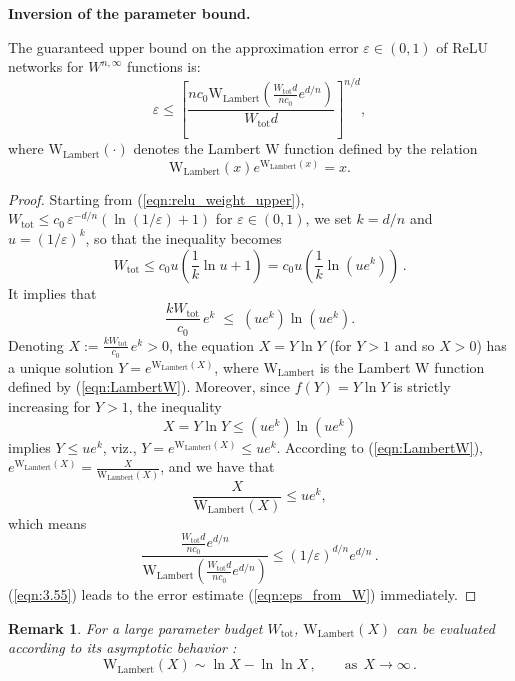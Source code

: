 \documentclass[final,hidelinks,onefignum,onetabnum]{siamart251216}
\newtheorem{remark}{Remark}
\begin{document}
\noindent\textbf{Inversion of the parameter bound.}
\begin{corollary}\label{cor:ReLu_approx}
The guaranteed upper bound on the approximation error $\varepsilon \in (0,1)$ of ReLU networks for $W^{n,\infty}$ functions is:
\begin{equation}\label{eqn:eps_from_W}
    \varepsilon \le \left[ \frac{n c_{0} \mathrm{W_{Lambert}}\left( \frac{W_{\mathrm{tot}} d}{n c_{0}} e^{d/n} \right)}{W_{\mathrm{tot}} d} \right]^{n/d},
\end{equation}
where $\mathrm{W_{Lambert}}(\cdot)$ denotes the Lambert $\mathrm{W}$ function \cite{corless1996lambert} defined by the relation
\begin{equation}\label{eqn:LambertW}
\mathrm{W_{Lambert}}(x)e^{\mathrm{W_{Lambert}}(x)}= x. 
\end{equation}
\end{corollary}
\begin{proof}
Starting from (\ref{eqn:relu_weight_upper}), $W_{\mathrm{tot}} \le c_{0}\,\varepsilon^{-d/n}(\ln(1/\varepsilon)+1)$ for $\varepsilon \in (0,1)$, we set $k = d/n$ and $u =(1/\varepsilon)^k$, so that the inequality becomes 
\[
W_{\mathrm{tot}} \le c_{0}u\left(\frac{1}{k}\ln u + 1\right)=c_{0}u \left(\frac{1}{k}\ln(ue^k)\right)\,.
\] 
It implies that
\[
\frac{kW_{\mathrm{tot}}}{c_{0}}\,e^k \;\le\; (ue^k)\ln(ue^k).
\]
Denoting $X:=\frac{kW_{\mathrm{tot}}}{c_{0}}\,e^k>0$, the equation $X=Y\ln Y$ (for $Y>1$ and so $X>0$) has a unique solution $Y = e^{\mathrm{W_{Lambert}}(X)}$, where $\mathrm{W_{Lambert}}$ is the Lambert $\mathrm{W}$ function \cite{corless1996lambert} defined by (\ref{eqn:LambertW}). Moreover, since $f(Y) = Y\ln Y$ is strictly increasing for $Y>1$, the inequality 
\[X=Y\ln Y\le (ue^k)\ln(ue^k)
\]
implies $Y\le ue^k$, viz., $Y=e^{\mathrm{W_{Lambert}}(X)}\le ue^k$. According to (\ref{eqn:LambertW}), $e^{\mathrm{W_{Lambert}}(X)}=\frac{X}{\mathrm{W_{Lambert}}(X)}$, and we have that
\[
\frac{X}{\mathrm{W_{Lambert}}(X)} \le ue^k,
\]
which means
\begin{equation}\label{eqn:3.55}
\frac{ \frac{W_{\mathrm{tot}} d}{n c_{0}} e^{d/n}}{\mathrm{W_{Lambert}}( \frac{W_{\mathrm{tot}} d}{n c_{0}} e^{d/n})} \le (1/\varepsilon)^{d/n}e^{d/n}\,.
\end{equation}
(\ref{eqn:3.55}) leads to the error estimate (\ref{eqn:eps_from_W}) immediately.
\end{proof}

\begin{remark} \label{WLambert}
For a large parameter budget $W_{\mathrm{tot}}$, $\mathrm{W_{Lambert}}(X)$ can be evaluated according to its asymptotic behavior \cite{corless1996lambert}:
\begin{equation} \label{eqn3.56}
\mathrm{W_{Lambert}}(X) \sim \ln X - \ln\ln X\,, \qquad \mathrm{as}\ \ X\to\infty\,.
\end{equation}
\end{remark}
\end{document}
